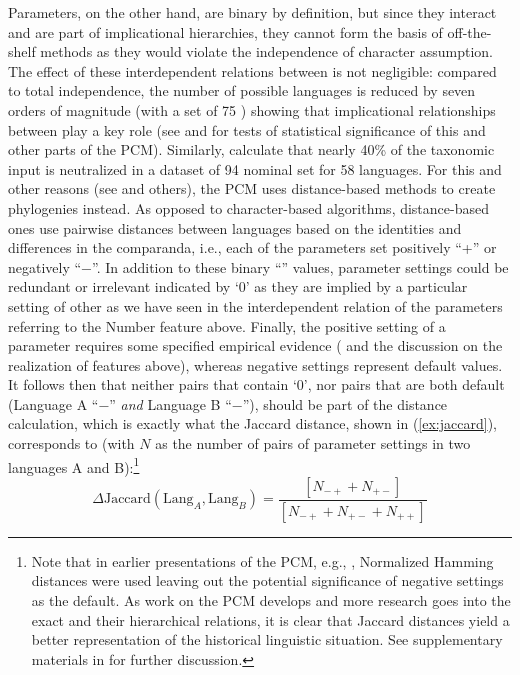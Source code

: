 \documentclass[output=paper,colorlinks,citecolor=brown]{langscibook}
\begin{document}
Parameters, on the other hand, are binary by definition, but since they interact and are part of implicational hierarchies, they cannot form the basis of off-the-shelf methods as they would violate the independence of character assumption. The effect of these interdependent relations between  is not negligible: compared to total independence, the number of possible languages is reduced by seven orders of magnitude (with a set of 75 ) showing that implicational relationships between  play a key role (see \citealt{mm:bortolussi_how_2011}  and \citealt{mm:longobardi_principles_2017} for tests of statistical significance of this and other parts of the PCM). Similarly, \citet{mm:ceolin_at_2021}  calculate that nearly 40\% of the taxonomic input is neutralized in a dataset of 94 nominal  set for 58 languages.  For this and other reasons (see \citealt{mm:mcmahon_language_2005} and others), the PCM uses distance-based methods to create phylogenies instead. As opposed to character\hyp based algorithms, distance-based ones use pairwise distances between languages based on the identities and differences in the comparanda, i.e., each of the parameters set positively “+” or negatively “−”. In addition to these binary “\pm” values, parameter settings could be redundant or irrelevant indicated by `0' as they are implied by a particular setting of other  as we have seen in the interdependent relation of the \isi{}parameters referring to the Number feature above. Finally, the positive setting of a parameter requires some specified empirical evidence (\citealt{mm:crisma_syntactic_2020}  and the discussion on the realization of features above), whereas negative settings represent default values. It follows then that neither pairs that contain `0', nor pairs that are both default (Language A “−” \textit{and} Language B “−”), should be part of the distance calculation, which is exactly what the Jaccard distance, shown in (\ref{ex:jaccard}), corresponds to (with $N$ as the number of pairs of parameter settings in two languages A and B):\footnote{Note that in earlier presentations of the PCM, e.g., \citet{mm:longobardi_evidence_2009}, Normalized Hamming distances were used leaving out the potential significance of negative settings as the default. As work on the PCM develops and more research goes into the exact  and their hierarchical relations, it is clear that Jaccard distances yield a better representation of the historical linguistic situation. See supplementary materials in \citet{mm:ceolin_at_2021} for further discussion.}
\begin{equation}
\Delta \text{Jaccard}(\text{Lang}_A,\text{Lang}_B) = \frac{[N_{-+} + N_{+-}]}{[N_{-+} + N_{+-} + N_{++}]}
\label{ex:jaccard}
\end{equation}
\end{document}
